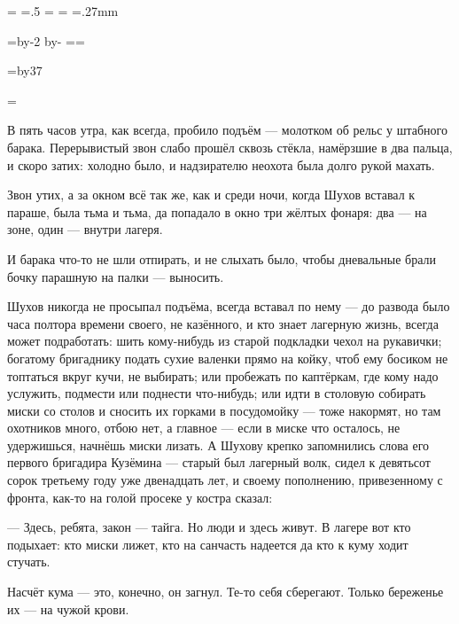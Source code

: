 \pdfpagewidth=297mm
\pdfpageheight=210mm
\pdfhorigin=1in
\pdfvorigin=0pt

\shhtotal=\pdfpagewidth
\htotal=.5\shhtotal
\vtotal=\pdfpageheight
\shoutline=0pt
\shstaplewidth=0pt
\shcrop=0pt
\shfootline={}
\shthickness=.27mm

\horigin=9mm
\hsize=\htotal \advance\hsize by-2\horigin
\advance\hsize by-\QUIRE
\output={\ifodd\pageno\else\hoffset=\QUIRE\fi \plainoutput}

\vorigin=3.8mm
\vsize=\topskip \advance\vsize by37\baselineskip

\footline={\line{\hss\tenrm\folio\hss}}

 

В пять часов утра, как всегда, пробило подъём --- молотком об рельс у штабного барака.
Перерывистый звон слабо прошёл сквозь стёкла, намёрзшие в два пальца, и скоро затих: холодно
было, и надзирателю неохота была долго рукой махать.

Звон утих, а за окном всё так же, как и среди ночи, когда Шухов вставал к параше, была тьма и
тьма, да попадало в окно три жёлтых фонаря: два --- на зоне, один --- внутри лагеря.

И барака что-то не шли отпирать, и не слыхать было, чтобы дневальные брали бочку парашную на
палки --- выносить.

Шухов никогда не просыпал подъёма, всегда вставал по нему --- до развода было часа полтора
времени своего, не казённого, и кто знает лагерную жизнь, всегда может подработать: шить
кому-нибудь из старой подкладки чехол на рукавички; богатому бригаднику подать сухие
валенки прямо на койку, чтоб ему босиком не топтаться вкруг кучи, не выбирать; или пробежать
по каптёркам, где кому надо услужить, подмести или поднести что-нибудь; или идти в столовую
собирать миски со столов и сносить их горками в посудомойку --- тоже накормят, но там
охотников много, отбою нет, а главное --- если в миске что осталось, не удержишься, начнёшь
миски лизать. А Шухову крепко запомнились слова его первого бригадира Кузёмина --- старый был
лагерный волк, сидел к девятьсот сорок третьему году уже двенадцать лет, и своему
пополнению, привезенному с фронта, как-то на голой просеке у костра сказал:

--- Здесь, ребята, закон --- тайга. Но люди и здесь живут. В лагере вот кто подыхает: кто миски
лижет, кто на санчасть надеется да кто к куму ходит стучать.

Насчёт кума --- это, конечно, он загнул. Те-то себя сберегают. Только береженье их --- на чужой
крови.

